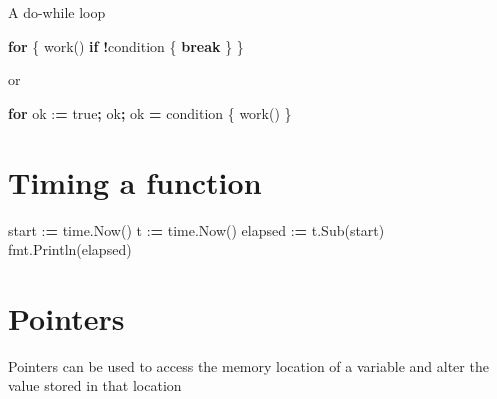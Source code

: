 \documentclass[]{book}
\newenvironment{Shaded}{\begin{snugshade}}{\end{snugshade}}
\newcommand{\ControlFlowTok}[1]{\textcolor[rgb]{0.13,0.29,0.53}{\textbf{#1}}}
\newcommand{\OperatorTok}[1]{\textcolor[rgb]{0.81,0.36,0.00}{\textbf{#1}}}
\newcommand{\NormalTok}[1]{#1}
\begin{document}
A do-while loop

\begin{Shaded}
\begin{Highlighting}[]
\ControlFlowTok{for}\NormalTok{ \{}
\NormalTok{    work()}
    \ControlFlowTok{if} \OperatorTok{!}\NormalTok{condition \{}
        \ControlFlowTok{break}
\NormalTok{    \}}
\NormalTok{\}}
\end{Highlighting}
\end{Shaded}

or

\begin{Shaded}
\begin{Highlighting}[]
\ControlFlowTok{for}\NormalTok{ ok :}\OperatorTok{=}\NormalTok{ true}\OperatorTok{;}\NormalTok{ ok}\OperatorTok{;}\NormalTok{ ok }\OperatorTok{=}\NormalTok{ condition \{}
\NormalTok{    work()}
\NormalTok{\}}
\end{Highlighting}
\end{Shaded}

\section{Timing a function}\label{timing-a-function}

\begin{Shaded}
\begin{Highlighting}[]
\NormalTok{start :}\OperatorTok{=}\NormalTok{ time.Now()}
\NormalTok{t :}\OperatorTok{=}\NormalTok{ time.Now()}
\NormalTok{elapsed :}\OperatorTok{=}\NormalTok{ t.Sub(start)}
\NormalTok{fmt.Println(elapsed)}
\end{Highlighting}
\end{Shaded}

\section{Pointers}\label{pointers}

Pointers can be used to access the memory location of a variable and
alter the value stored in that location
\end{document}
